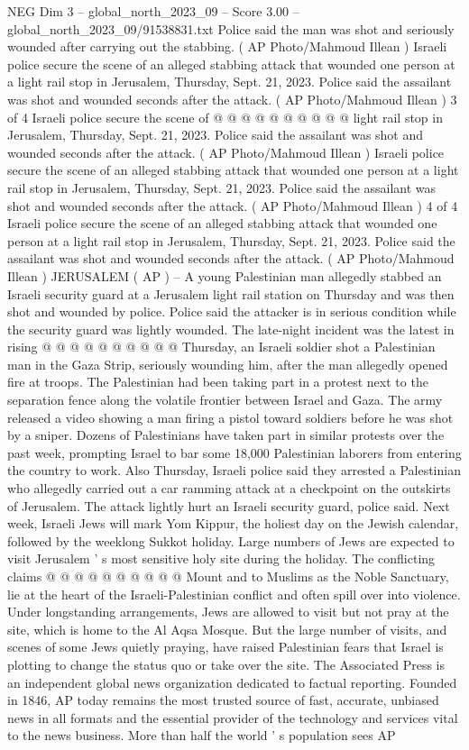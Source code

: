\begin{textsample}{NEG Dim 3 – global\_north\_2023\_09 – Score 3.00 – global\_north\_2023\_09/91538831.txt}
Police said the man was shot and seriously wounded after carrying out the stabbing. ( AP Photo/Mahmoud Illean ) Israeli police secure the scene of an alleged stabbing attack that wounded one person at a light rail stop in Jerusalem, Thursday, Sept. 21, 2023.
Police said the assailant was shot and wounded seconds after the attack. ( AP Photo/Mahmoud Illean ) 3 of 4 Israeli police secure the scene of @ @ @ @ @ @ @ @ @ @ light rail stop in Jerusalem, Thursday, Sept. 21, 2023.
Police said the assailant was shot and wounded seconds after the attack. ( AP Photo/Mahmoud Illean ) Israeli police secure the scene of an alleged stabbing attack that wounded one person at a light rail stop in Jerusalem, Thursday, Sept. 21, 2023.
Police said the assailant was shot and wounded seconds after the attack. ( AP Photo/Mahmoud Illean ) 4 of 4 Israeli police secure the scene of an alleged stabbing attack that wounded one person at a light rail stop in Jerusalem, Thursday, Sept. 21, 2023.
Police said the assailant was shot and wounded seconds after the attack. ( AP Photo/Mahmoud Illean ) JERUSALEM ( AP ) -- A young Palestinian man allegedly stabbed an Israeli security guard at a Jerusalem light rail station on Thursday and was then shot and wounded by police.
Police said the attacker is in serious condition while the security guard was lightly wounded.
The late-night incident was the latest in rising @ @ @ @ @ @ @ @ @ @ Thursday, an Israeli soldier shot a Palestinian man in the Gaza Strip, seriously wounding him, after the man allegedly opened fire at troops.
The Palestinian had been taking part in a protest next to the separation fence along the volatile frontier between Israel and Gaza.
The army released a video showing a man firing a pistol toward soldiers before he was shot by a sniper.
Dozens of Palestinians have taken part in similar protests over the past week, prompting Israel to bar some 18,000 Palestinian laborers from entering the country to work.
Also Thursday, Israeli police said they arrested a Palestinian who allegedly carried out a car ramming attack at a checkpoint on the outskirts of Jerusalem.
The attack lightly hurt an Israeli security guard, police said.
Next week, Israeli Jews will mark Yom Kippur, the holiest day on the Jewish calendar, followed by the weeklong Sukkot holiday.
Large numbers of Jews are expected to visit Jerusalem ' s most sensitive holy site during the holiday.
The conflicting claims @ @ @ @ @ @ @ @ @ @ Mount and to Muslims as the Noble Sanctuary, lie at the heart of the Israeli-Palestinian conflict and often spill over into violence.
Under longstanding arrangements, Jews are allowed to visit but not pray at the site, which is home to the Al Aqsa Mosque.
But the large number of visits, and scenes of some Jews quietly praying, have raised Palestinian fears that Israel is plotting to change the status quo or take over the site.
The Associated Press is an independent global news organization dedicated to factual reporting.
Founded in 1846, AP today remains the most trusted source of fast, accurate, unbiased news in all formats and the essential provider of the technology and services vital to the news business.
More than half the world ' s population sees AP


\end{textsample}
